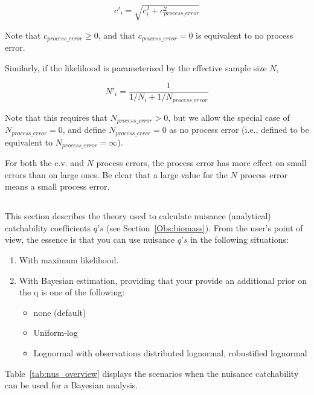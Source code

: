 \begin{equation}
  c'_i  = \sqrt {c_i^2  + c_{process\_error}^2 } 
\end{equation}

Note that $c_{process\_ error} \ge 0$, and that $c_{process\_ error} = 0$ is equivalent to no process error.

Similarly, if the likelihood is parameterised by the effective sample size $N$,

\begin{equation}
 N'_i  = \frac{1}{1 / {N_i}+ 1 / N_{process\_error}}
\end{equation}

Note that this requires that $N_{process\_ error} > 0$, but we allow the special case of $N_{process\_ error}=0$, and define $N_{process\_ error}=0$ as no process error (i.e., defined to be equivalent to $N_{process\_ error}=\infty$). 

For both the c.v. and $N$ process errors, the process error has more effect on small errors than on large ones. Be clear that a large value for the $N$ process error means a small process error.

\subsection{}\label{subsec:nuisance}
This section describes the theory used to calculate nuisance (analytical) catchability coefficients $q’s$ (see Section~\ref{Obs:biomass}). From the user's point of view, the essence is that you can use nuisance $q’s$ in the following situations:
\begin{enumerate}
	\item With maximum likelihood.
	\item With Bayesian estimation, providing that your provide an additional prior on the q is one of the following:
		\begin{itemize} 
			\item none (default)
			\item Uniform-log
			\item Lognormal with observations distributed lognormal, robustified lognormal
		\end{itemize}
\end{enumerate}
Table~\ref{tab:nus_overview} displays the scenarios when the nuisance catchability can be used for a Bayesian analysis.

